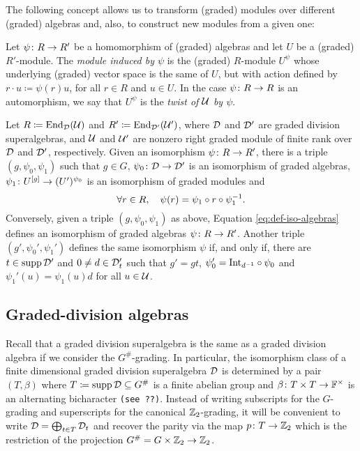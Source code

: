 The following concept allows us to transform (graded) modules over different (graded) algebras and, also, to construct new modules from a given one:

\begin{defi}\label{def:twist}
    Let $\psi\colon R \to R'$ be a homomorphism of (graded) algebras and let $U$ be a (graded) $R' $-module. 
    The \emph{module induced by $\psi$} is the (graded) $R$-module $U^{\psi}$ whose underlying (graded) vector space is the same of $U$, but with action defined by $r \cdot u \coloneqq \psi(r)u$, for all $r\in R$ and $u\in U$. 
    In the case $\psi\colon R \to R$ is an automorphism, we say that $U^{\psi}$ is the \emph{twist of $\mathcal U$ by $\psi$}.
\end{defi}

\begin{thm}\label{thm:iso-abstract}
    Let $R \coloneqq \operatorname{End}_{\mathcal{D}}(\mathcal U)$ and $R' \coloneqq \operatorname{End}_{\mathcal{D}'}(\mathcal U')$, where $\mathcal{D}$ and $\mathcal{D}'$ are graded division superalgebras, and $\mathcal U$ and $\mathcal U'$ are nonzero right graded module of finite rank over $\mathcal{D}$ and $\mathcal{D}'$, respectively. 
    Given an isomorphism $\psi\colon R \to R'$, there is a triple $(g, \psi_0, \psi_1)$ such that $g \in G$, $\psi_0\colon \mathcal{D} \to \mathcal{D}'$ is an isomorphism of graded algebras, $\psi_1\colon U^{[g]} \to (U')^{\psi_0}$ is an isomorphism of graded modules and 
    \begin{equation}\label{eq:def-iso-algebras}
            \forall r\in R, \quad \psi(r) = \psi_1 \circ r \circ \psi_1^{-1}.
    \end{equation}
    Conversely, given a triple $(g, \psi_0, \psi_1)$ as above, Equation \eqref{eq:def-iso-algebras} defines an isomorphism of graded algebras $\psi\colon R \to R'$. 
    Another triple $(g', \psi_0', \psi_1')$ defines the same isomorphism $\psi$ if, and only if, there are $t\in \operatorname{supp} \mathcal{D}'$ and $0 \neq d\in \mathcal{D}'_t$ such that $g'= gt$, $\psi_0' = \mathrm{Int}_{d^{-1}} \circ \psi_0$ and $\psi_1' (u) = \psi_1 (u) d$ for all $u \in \mathcal U$.
\end{thm}

\subsection{Graded-division algebras}


Recall that a graded division superalgebra is the same as a graded division algebra if we consider the $G^\#$-grading. 
In particular, the isomorphism class of a finite dimensional graded division superalgebra $\mathcal{D}$ is determined by a pair $(T, \beta)$ where $T \coloneqq \operatorname{supp} \mathcal{D} \subseteq G^\#$ is a finite abelian group and $\beta\colon T\times T \to \mathbb{F}^\times$ is an alternating bicharacter {\tt (see ??)}. 
Instead of writing subscripts for the $G$-grading and superscripts for the canonical $\mathbb{Z}_2$-grading, it will be convenient to write $\mathcal{D} = \bigoplus_{t\in T} \mathcal{D}_t$ and recover the parity via the map $p\colon T \to \mathbb{Z}_2$ which is the restriction of the projection $G^\# = G\times \mathbb{Z}_2 \to \mathbb{Z}_2$. 

